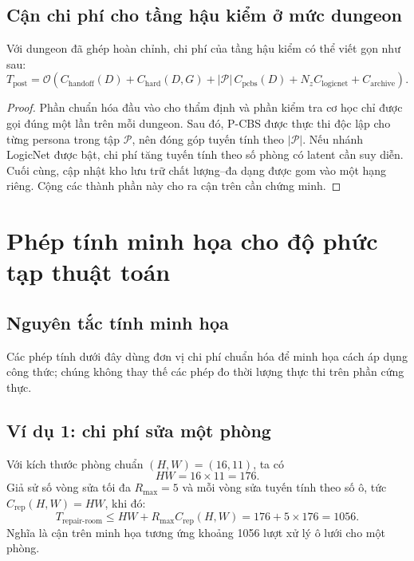 \documentclass[oneside,a4paper,12pt]{extreport}
\begin{document}
\subsection{Cận chi phí cho tầng hậu kiểm ở mức dungeon}
Với dungeon đã ghép hoàn chỉnh, chi phí của tầng hậu kiểm có thể viết gọn như sau:
\begin{equation}
T_{\text{post}}=\mathcal{O}\!\left(
C_{\text{handoff}}(D)+
C_{\text{hard}}(D,G)+
|\mathcal{P}|\,C_{\text{pcbs}}(D)+
N_zC_{\text{logicnet}}+
C_{\text{archive}}
\right).
\end{equation}
\begin{proof}
Phần chuẩn hóa đầu vào cho thẩm định và phần kiểm tra cơ học chỉ được gọi đúng một lần trên mỗi dungeon. Sau đó, P-CBS được thực thi độc lập cho từng persona trong tập $\mathcal{P}$, nên đóng góp tuyến tính theo $|\mathcal{P}|$. Nếu nhánh LogicNet được bật, chi phí tăng tuyến tính theo số phòng có latent cần suy diễn. Cuối cùng, cập nhật kho lưu trữ chất lượng--đa dạng được gom vào một hạng riêng. Cộng các thành phần này cho ra cận trên cần chứng minh.
\end{proof}

\FloatBarrier
\section{Phép tính minh họa cho độ phức tạp thuật toán}
\label{app:numeric_complexity_examples}

\subsection{Nguyên tắc tính minh họa}
Các phép tính dưới đây dùng đơn vị chi phí chuẩn hóa để minh họa cách áp dụng công thức; chúng không thay thế các phép đo thời lượng thực thi trên phần cứng thực.

\subsection{Ví dụ 1: chi phí sửa một phòng}
Với kích thước phòng chuẩn $(H,W)=(16,11)$, ta có
\begin{equation}
HW=16\times 11=176.
\end{equation}
Giả sử số vòng sửa tối đa $R_{\max}=5$ và mỗi vòng sửa tuyến tính theo số ô, tức $C_{\text{rep}}(H,W)=HW$, khi đó:
\begin{equation}
T_{\text{repair-room}}\le HW+R_{\max}C_{\text{rep}}(H,W)=176+5\times 176=1056.
\end{equation}
Nghĩa là cận trên minh họa tương ứng khoảng 1056 lượt xử lý ô lưới cho một phòng.
\end{document}
